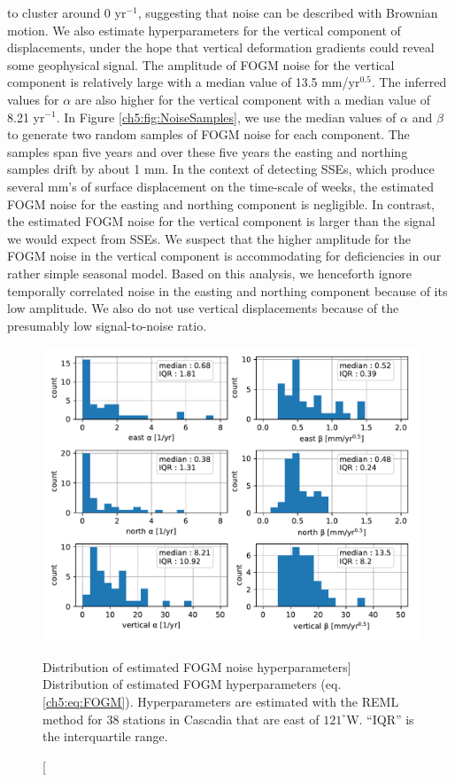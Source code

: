 to cluster around 0 yr$^{-1}$, suggesting that noise can be described
with Brownian motion. We also estimate hyperparameters for the
vertical component of displacements, under the hope that vertical
deformation gradients could reveal some geophysical signal. The
amplitude of FOGM noise for the vertical component is relatively large
with a median value of 13.5 mm/yr$^{0.5}$.  The inferred values for
$\alpha$ are also higher for the vertical component with a median
value of 8.21 yr$^{-1}$. In Figure \ref{ch5:fig:NoiseSamples}, we use
the median values of $\alpha$ and $\beta$ to generate two random
samples of FOGM noise for each component. The samples span five years
and over these five years the easting and northing samples drift by
about 1 mm. In the context of detecting SSEs, which produce several
mm's of surface displacement on the time-scale of weeks, the estimated
FOGM noise for the easting and northing component is negligible. In
contrast, the estimated FOGM noise for the vertical component is
larger than the signal we would expect from SSEs. We suspect that the
higher amplitude for the FOGM noise in the vertical component is
accommodating for deficiencies in our rather simple seasonal model.
Based on this analysis, we henceforth ignore temporally correlated
noise in the easting and northing component because of its low
amplitude. We also do not use vertical displacements because of the
presumably low signal-to-noise ratio.

\begin{figure}
\includegraphics{ch5/figures/noise/noise-params.pdf}
\caption
[Distribution of estimated FOGM noise hyperparameters]
{Distribution of estimated FOGM hyperparameters (eq.
\ref{ch5:eq:FOGM}). Hyperparameters are estimated with the REML method
for 38 stations in Cascadia that are east of $121^\circ$W. ``IQR'' is
the interquartile range.}
\label{ch5:fig:NoiseParams}
\end{figure}

